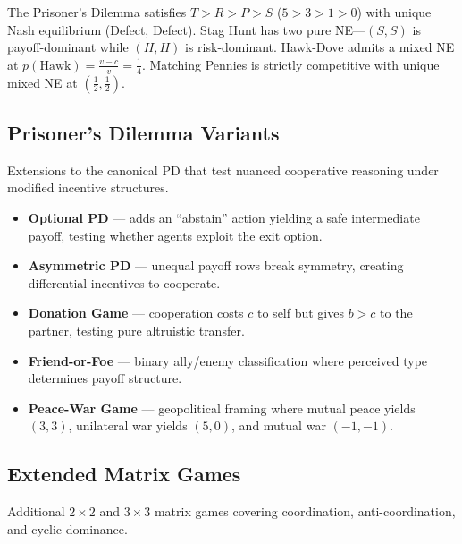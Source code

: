 The Prisoner's Dilemma satisfies $T > R > P > S$ ($5 > 3 > 1 > 0$) with unique
Nash equilibrium (Defect, Defect). Stag Hunt has two pure NE---$(S,S)$ is
payoff-dominant while $(H,H)$ is risk-dominant. Hawk-Dove admits a mixed NE at
$p(\text{Hawk}) = \tfrac{v-c}{v} = \tfrac{1}{4}$. Matching Pennies is strictly
competitive with unique mixed NE at $(\tfrac{1}{2}, \tfrac{1}{2})$.

\subsection{Prisoner's Dilemma Variants}
\label{sec:pd-variants}

Extensions to the canonical PD that test nuanced cooperative reasoning under
modified incentive structures.

\begin{itemize}[nosep]
    \item \textbf{Optional PD} --- adds an ``abstain'' action yielding a safe
          intermediate payoff, testing whether agents exploit the exit option.
    \item \textbf{Asymmetric PD} --- unequal payoff rows break symmetry,
          creating differential incentives to cooperate.
    \item \textbf{Donation Game} --- cooperation costs $c$ to self but gives $b > c$
          to the partner, testing pure altruistic transfer.
    \item \textbf{Friend-or-Foe} --- binary ally/enemy classification where
          perceived type determines payoff structure.
    \item \textbf{Peace-War Game} --- geopolitical framing where mutual peace
          yields $(3,3)$, unilateral war yields $(5,0)$, and mutual war $(-1,-1)$.
\end{itemize}

\subsection{Extended Matrix Games}
\label{sec:extended-matrix}

Additional $2 \times 2$ and $3 \times 3$ matrix games covering coordination,
anti-coordination, and cyclic dominance.

